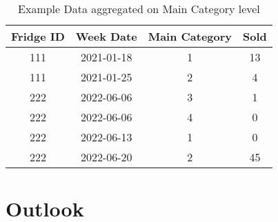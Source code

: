 \begin{table}[h!]
\centering
\begin{tabular}{cccc}
\hline
\rowcolor[HTML]{FFFFFF} 
\textbf{Fridge ID} & \textbf{Week Date} & \textbf{Main Category} & \textbf{Sold} \\ \hline
111                & 2021-01-18         & 1                      & 13             \\
111                & 2021-01-25         & 2                      & 4             \\
222                & 2022-06-06         & 3                      & 1             \\
222                & 2022-06-06         & 4                      & 0             \\
222                & 2022-06-13         & 1                      & 0             \\
222                & 2022-06-20         & 2                      & 45            \\ \hline
\end{tabular}
\caption{Example Data aggregated on Main Category level}
\label{tab:ExampleData aggregated}
\end{table}

\section{Outlook}
\label{sec: Outlook}

